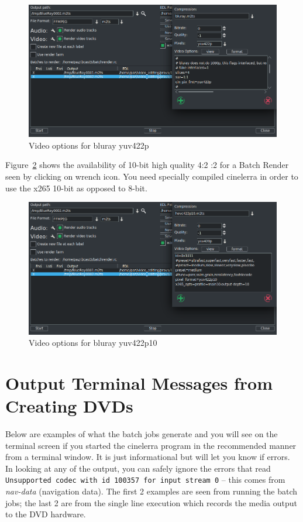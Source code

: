 \begin{figure}[htpb]
    \centering
    \includegraphics[width=0.7\linewidth]{images/dvd-batch03.png}
    \caption{Video options for bluray yuv422p}
    \label{fig:dvd-batch03}
\end{figure}

Figure~\ref{fig:dvd-batch04} shows the availability of 10-bit high quality 4:2 :2 for a Batch Render seen by clicking on wrench icon.  You need specially compiled cinelerra in order to use the x265 10-bit as opposed to 8-bit.

\begin{figure}[htpb]
    \centering
    \includegraphics[width=0.7\linewidth]{images/dvd-batch04.png}
    \caption{Video options for bluray yuv422p10}
    \label{fig:dvd-batch04}
\end{figure}

\section{Output Terminal Messages from Creating DVDs}%
\label{sec:output_terminal_messages_dvd}

Below are examples of what the batch jobs generate and you will see on the terminal screen if you started the cinelerra program in the recommended manner from a terminal window.  It is just informational but will let you know if errors.  In looking at any of the output, you can safely ignore the errors that read \texttt{Unsupported codec with id 100357 for input stream 0} -- this comes from \textit{nav-data} (navigation data).  The first 2 examples are seen from running the batch jobs; the last 2 are from the single line execution which records the media output to the DVD hardware.

